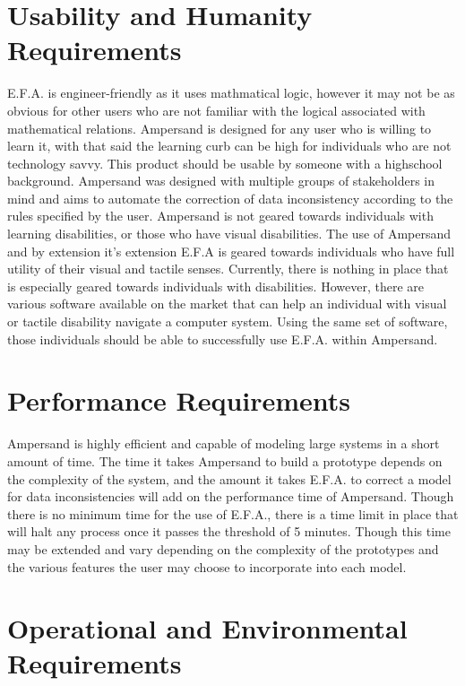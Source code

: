 \documentclass[12pt]{report}
\begin{document}
\section{Usability and Humanity Requirements}\label{sec:Usability}
E.F.A. is engineer-friendly as it uses mathmatical logic, however it may not be 
as obvious for other users who are not familiar with the logical associated 
with mathematical relations. Ampersand is designed for any user who is willing 
to learn it, with that said the learning curb can be high for individuals who 
are not technology savvy. This product should be usable by someone with a 
highschool background. Ampersand was designed with multiple groups of 
stakeholders in mind and aims to automate the correction of data inconsistency 
according to the rules specified by the user. 
Ampersand is not geared towards individuals with learning disabilities, or 
those who have visual disabilities. The use of Ampersand and by extension it's 
extension E.F.A is geared towards individuals who have full utility of their 
visual and tactile senses. Currently, there is nothing in place that is 
especially geared towards individuals with disabilities. However, there are 
various software available on the market that can help an individual with 
visual or tactile disability navigate a computer system. Using the same set of 
software, those individuals should be able to successfully use E.F.A. within 
Ampersand. 
\section{Performance Requirements}\label{sec:Performance}
Ampersand is highly efficient and capable of modeling large systems in a short 
amount of time. The time it takes Ampersand to build a prototype depends on the 
complexity of the system, and the amount it takes E.F.A. to correct a model for 
data inconsistencies will add on the performance time of Ampersand. Though 
there is no minimum time for the use of E.F.A., there is a time limit in place 
that will halt any process once it passes the threshold of 5 minutes. Though 
this time may be extended and vary depending on the complexity of the 
prototypes and the various features the user may choose to incorporate into 
each model. 
\section{Operational and Environmental Requirements}\label{sec:Operational}
\end{document}
